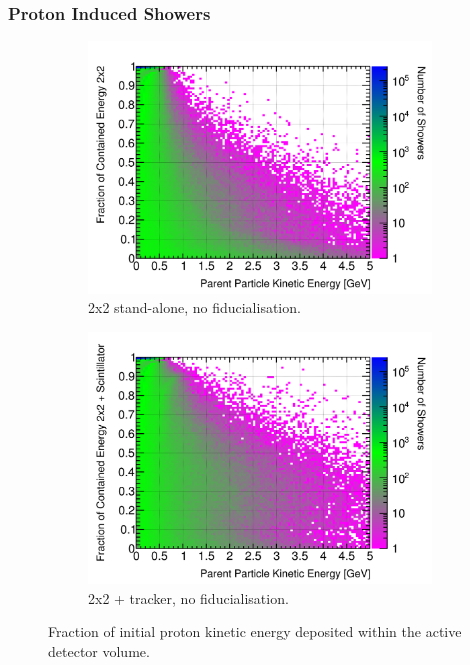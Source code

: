 \documentclass[10pt,a4paper,openany]{article}
\begin{document}
\subsubsection{Proton Induced Showers}
\begin{figure}[htbp]
	\centering
	\begin{subfigure}[b]{0.49\textwidth}
		\centering
		\includegraphics[width=1.0\textwidth]{P_contained_frac_2x2.png}
		\caption{2x2 stand-alone, no fiducialisation.}
		\label{}
	\end{subfigure}	
	\hfill
	\begin{subfigure}[b]{0.49\textwidth}
		\centering
		\includegraphics[width=1.0\textwidth]{P_contained_frac_2x2_Scintillator_gap.png}
		\caption{2x2 + tracker, no fiducialisation.}
		\label{}
	\end{subfigure}	
	\caption{Fraction of initial proton kinetic energy deposited within the active detector volume.}
\end{figure}
\end{document}
